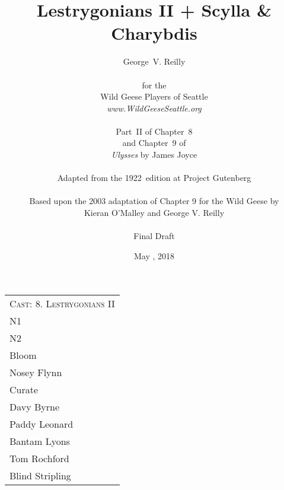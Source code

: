 



\title{\Huge Lestrygonians II + Scylla \& Charybdis}
\author{George~V. Reilly\\
\\
{\small for the}\\
Wild Geese Players of Seattle\\
{\emph{www.WildGeeseSeattle.org}}\\
\\
{\small Part~II of Chapter~8}\\
{\small and Chapter~9 of}\\
{\small \emph{Ulysses} by James Joyce}\\
\\
{\small Adapted from the 1922~edition at Project Gutenberg}
\\
\\
{\small Based upon the 2003 adaptation of Chapter 9 for the Wild Geese by}\\
{\small Kieran O'Malley and George V. Reilly}\\
\\
{\small Final Draft}}
\date{May , 2018}
\raggedbottom



\maketitle
\thispagestyle{empty}
\pagebreak


\begin{tabular}{l p{5cm} l p{5cm}}
    \multicolumn{4}{c}{\Large \textsc{Cast: 8. Lestrygonians II}} \\
N1 \\
N2 \\
Bloom \\
Nosey Flynn \\
Curate \\
Davy Byrne \\
Paddy Leonard \\
Bantam Lyons \\
Tom Rochford \\
Blind Stripling \\
\end{tabular}

\bigskip
\bigskip

